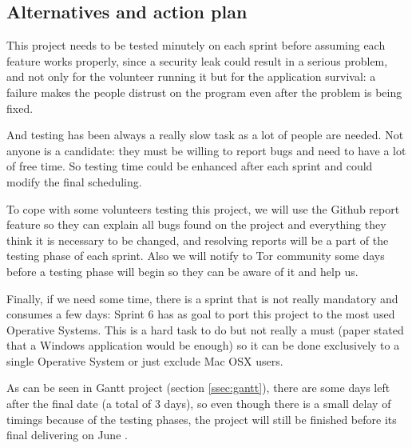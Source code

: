 \subsection{Alternatives and action plan}
\label{ssec:alternativesSchedule}
This project needs to be tested minutely on each sprint before assuming each feature works properly, since a security leak could result in a serious problem, and not only for the volunteer running it but for the application survival: a failure makes the people distrust on the program even after the problem is being fixed.

And testing has been always a really slow task as a lot of people are needed. Not anyone is a candidate: they must be willing to report bugs and need to have a lot of free time. So testing time could be enhanced after each sprint and could modify the final scheduling.

To cope with some volunteers testing this project, we will use the Github report feature so they can explain all bugs found on the project and everything they think it is necessary to be changed, and resolving reports will be a part of the testing phase of each sprint. Also we will notify to Tor community some days before a testing phase will begin so they can be aware of it and help us. 

Finally, if we need some time, there is a sprint that is not really mandatory and consumes a few days: Sprint 6 has as goal to port this project to the most used Operative Systems. This is a hard task to do but not really a must (paper stated that a Windows application would be enough) so it can be done exclusively to a single Operative System or just exclude Mac OSX users.

As can be seen in Gantt project (section \ref{ssec:gantt}), there are some days left after the final date (a total of 3 days), so even though there is a small delay of timings because of the testing phases, the project will still be finished before its final delivering on June  .
